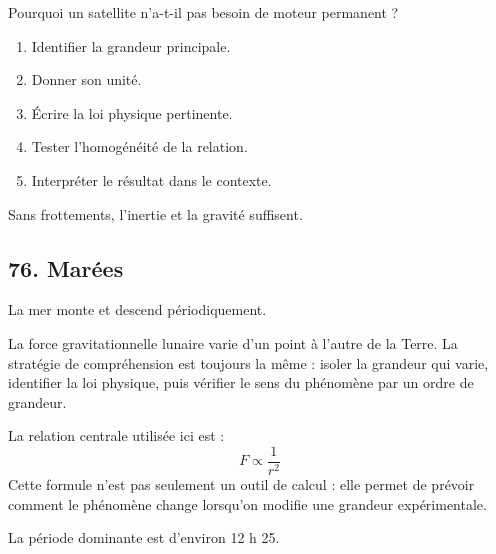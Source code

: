 \documentclass[11pt,a4paper]{article}
\begin{document}
\begin{exercicebox}
Pourquoi un satellite n'a-t-il pas besoin de moteur permanent ?
\begin{enumerate}
  \item Identifier la grandeur principale.
  \item Donner son unité.
  \item Écrire la loi physique pertinente.
  \item Tester l'homogénéité de la relation.
  \item Interpréter le résultat dans le contexte.
\end{enumerate}
\end{exercicebox}

\begin{corrigebox}[Indication]
Sans frottements, l'inertie et la gravité suffisent.
\end{corrigebox}


\subsection{76. Marées}

\begin{exemplebox}
La mer monte et descend périodiquement.
\end{exemplebox}

\begin{methodebox}
La force gravitationnelle lunaire varie d'un point à l'autre de la Terre.
La stratégie de compréhension est toujours la même : isoler la grandeur qui varie, identifier la loi physique, puis vérifier le sens du phénomène par un ordre de grandeur.
\end{methodebox}

\begin{theorembox}
La relation centrale utilisée ici est :
\[
F\propto\frac1{r^2}
\]
Cette formule n'est pas seulement un outil de calcul : elle permet de prévoir comment le phénomène change lorsqu'on modifie une grandeur expérimentale.
\end{theorembox}

\begin{odgbox}
La période dominante est d'environ 12 h 25.
\end{odgbox}
\end{document}
